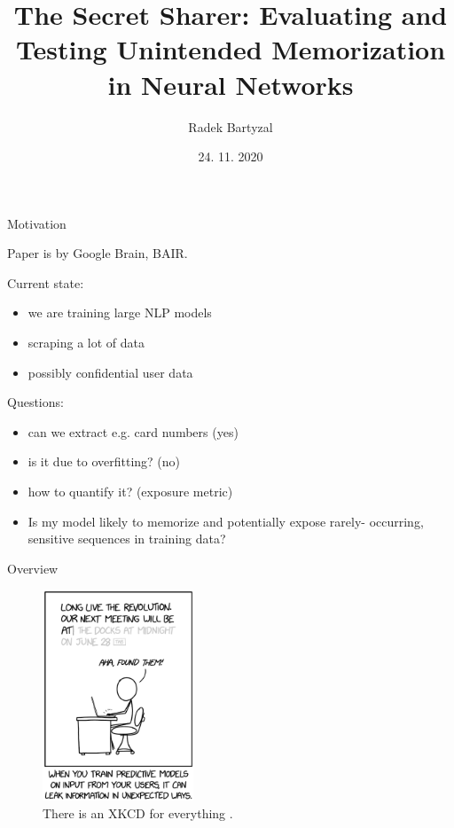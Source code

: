 \documentclass{beamer}
\begin{document}
\title[The Secret Sharer]{The Secret Sharer: Evaluating and Testing Unintended Memorization in Neural Networks}  
\author{Radek Bartyzal}
\date{24. 11. 2020} 

\frame{\titlepage} 

\begin{frame}{Motivation}

Paper is by Google Brain, BAIR.
\vfill

Current state:
\begin{itemize}
\item we are training large NLP models
\item scraping a lot of data
\item possibly confidential user data
\end{itemize}
\vfill
Questions:
\begin{itemize}
\item can we extract e.g. card numbers (yes)
\item is it due to overfitting? (no)
\item how to quantify it? (exposure metric)
\item Is my model likely to memorize and potentially expose rarely- occurring, sensitive sequences in training data?
\end{itemize}

\end{frame}
\begin{frame}{Overview}

\begin{figure}[h]
\includegraphics[width=0.4\textwidth]{img/xkcd}
\caption{There is an XKCD for everything \cite{cit:xkcd}.}
\end{figure}

\end{frame}
\end{document}
